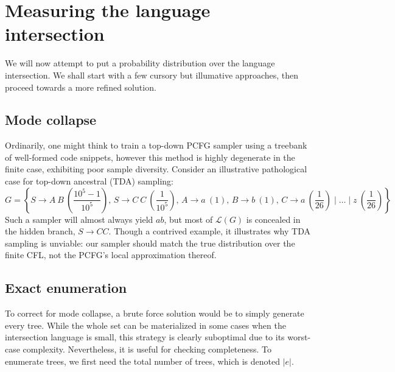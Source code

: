 \documentclass[sigplan,review,acmsmall,nonacm,screen,anonymous]{acmart}\settopmatter{printfolios=false,printccs=false,printacmref=false}
\begin{document}
\clearpage

\section{Measuring the language intersection}\label{sec:measurement}

We will now attempt to put a probability distribution over the language intersection. We shall start with a few cursory but illumative approaches, then proceed towards a more refined solution.

\subsection{Mode collapse}

Ordinarily, one might think to train a top-down PCFG sampler using a treebank of well-formed code snippets, however this method is highly degenerate in the finite case, exhibiting poor sample diversity. Consider an illustrative pathological case for top-down ancestral (TDA) sampling:
$$
G=\left\{ S \rightarrow A\:B \: \left(\frac{10^5 - 1}{10^5}\right), \hspace{2pt}
     S \rightarrow C\:C \: \left(\frac{1}{10^5}\right), \hspace{2pt}
     A \rightarrow a \: (1), \hspace{2pt}
     B  \rightarrow b \: (1), \hspace{2pt}
     C  \rightarrow a \: \left(\frac{1}{26}\right) \mid \ldots \mid z \: \left(\frac{1}{26}\right)\right\}
$$
Such a sampler will almost always yield $a b$, but most of $\mathcal{L}(G)$ is concealed in the hidden branch, $S \rightarrow C C$. Though a contrived example, it illustrates why TDA sampling is unviable: our sampler should match the true distribution over the finite CFL, not the PCFG's local approximation thereof.

\subsection{Exact enumeration}

To correct for mode collapse, a brute force solution would be to simply generate every tree. While the whole set can be materialized in some cases when the intersection language is small, this strategy is clearly suboptimal due to its worst-case complexity. Nevertheless, it is useful for checking completeness. To enumerate trees, we first need the total number of trees, which is denoted $|e|$.
\end{document}
